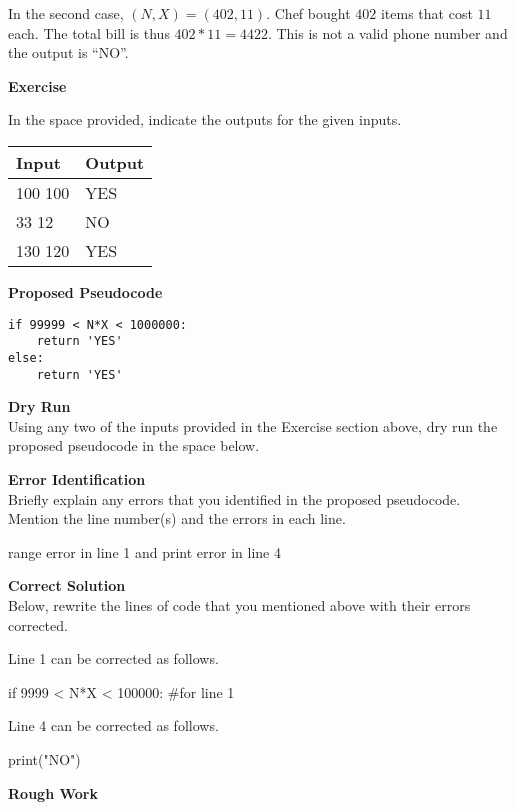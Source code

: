 \documentclass[a4paper]{exam}
\newcommand\heading[1]{\textbf{#1}}
\begin{document}
\begin{questions}
    In the second case, $(N,X)=(402,11)$. Chef bought $402$ items that cost $11$ each. The total bill is thus $402 * 11 = 4422$. This is not a valid phone number and the output is ``NO''.

    \heading{Exercise}

    In the space provided, indicate the outputs for the given inputs.

    \begin{tabularx}{\textwidth}{|X|X|}
        \rowcolor{gray!50}
        \hline
        Input   & Output \\ \hline\hline
        100 100 & YES    \\\hline
        33 12   & NO     \\\hline
        130 120 & YES    \\\hline
    \end{tabularx}

    \heading{Proposed Pseudocode}
\begin{verbatim}
if 99999 < N*X < 1000000:
    return 'YES'
else:
    return 'YES'
\end{verbatim}

    \heading{Dry Run}\\
    Using any two of the inputs provided in the Exercise section above, dry run the proposed pseudocode in the space below.
    \vspace*{100pt}

    \heading{Error Identification}\\
    Briefly explain any errors that you identified in the proposed pseudocode. Mention the line number(s) and the errors in each line.

    \begin{mdframed}
    range error in line 1 and print error in line 4
    \end{mdframed}
  
    \heading{Correct Solution}\\
    Below, rewrite the lines of code that you mentioned above with their errors corrected.

    Line 1 can be corrected as follows.
\begin{python}[numbers=none]
if 9999 < N*X < 100000: #for line 1
\end{python}

        Line 4 can be corrected as follows.
\begin{python}[numbers=none]
print("NO")
\end{python}            

    \newpage
    \centerline{\heading{Rough Work}}
\end{questions}
\end{document}
